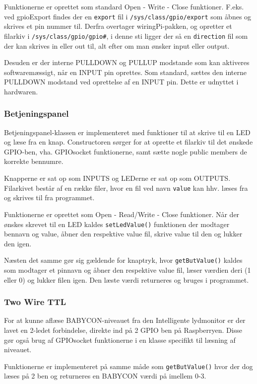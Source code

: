 Funktionerne er oprettet som standard Open - Write - Close funktioner. F.eks. ved gpioExport findes der en \verb+export+ fil i \verb+/sys/class/gpio/export+ som åbnes og skrives et pin nummer til. Derfra overtager wiringPi-pakken, og opretter et filarkiv i \verb+/sys/class/gpio/gpio#+, i denne sti ligger der så en \verb+direction+ fil som der kan skrives in eller out til, alt efter om man ønsker input eller output.

Desuden er der interne PULLDOWN og PULLUP modstande som kan aktiveres softwaremæssigt, når en INPUT pin oprettes. Som standard, sættes den interne PULLDOWN modstand ved oprettelse af en INPUT pin. Dette er udnyttet i hardwaren.

\subsubsection*{Betjeningspanel}

Betjeningspanel-klassen er implementeret med funktioner til at skrive til en LED og læse fra en knap. Constructoren sørger for at oprette et filarkiv til det ønskede GPIO-ben, vha. GPIOsocket funktionerne, samt sætte nogle public members de korrekte bennumre. 

Knapperne er sat op som INPUTS og LEDerne er sat op som OUTPUTS. Filarkivet består af en række filer, hvor en fil ved navn \verb+value+ kan hhv. læses fra og skrives til fra programmet.

Funktionerne er oprettet som Open - Read/Write - Close funktioner. Når der ønskes skrevet til en LED kaldes \verb+setLedValue()+ funktionen der modtager bennavn og value, åbner den respektive value fil, skrive value til den og lukker den igen.

Næsten det samme gør sig gældende for knaptryk, hvor \verb+getButValue()+ kaldes som modtager et pinnavn og åbner den respektive value fil, læser værdien deri (1 eller 0) og lukker filen igen. Den læste værdi returneres og bruges i programmet. 

\subsubsection*{Two Wire TTL}

For at kunne aflæse BABYCON-niveauet fra den Intelligente lydmonitor er der lavet en 2-ledet forbindelse, direkte ind på 2 GPIO ben på Raspberryen. Disse gør også brug af GPIOsocket funktionerne i en klasse specifikt til læsning af niveauet.

Funktionerne er implementeret på samme måde som \verb+getButValue()+ hvor der dog læses på 2 ben og returneres en BABYCON værdi på imellem 0-3.

